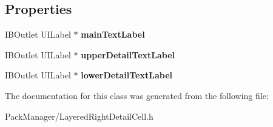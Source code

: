 \subsection*{Properties}
\begin{DoxyCompactItemize}
\item 
\hypertarget{interface_layered_right_detail_cell_aabc0589a423bde3b49a53a9d4be5277b}{I\-B\-Outlet U\-I\-Label $\ast$ {\bfseries main\-Text\-Label}}\label{interface_layered_right_detail_cell_aabc0589a423bde3b49a53a9d4be5277b}

\item 
\hypertarget{interface_layered_right_detail_cell_a640825f6998623ef2d1c17589daaf877}{I\-B\-Outlet U\-I\-Label $\ast$ {\bfseries upper\-Detail\-Text\-Label}}\label{interface_layered_right_detail_cell_a640825f6998623ef2d1c17589daaf877}

\item 
\hypertarget{interface_layered_right_detail_cell_a91a30bbf1dbe60d1871978b54daf8520}{I\-B\-Outlet U\-I\-Label $\ast$ {\bfseries lower\-Detail\-Text\-Label}}\label{interface_layered_right_detail_cell_a91a30bbf1dbe60d1871978b54daf8520}

\end{DoxyCompactItemize}


The documentation for this class was generated from the following file\-:\begin{DoxyCompactItemize}
\item 
Pack\-Manager/Layered\-Right\-Detail\-Cell.\-h\end{DoxyCompactItemize}
